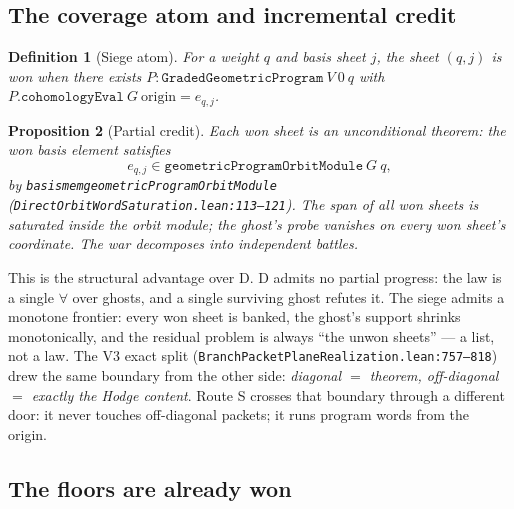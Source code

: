 \documentclass[11pt]{article}
\renewcommand{\_}{\textunderscore\allowbreak}
\newtheorem{definition}{Definition}[section]
\newtheorem{proposition}[definition]{Proposition}
\begin{document}
\subsection{The coverage atom and incremental credit}

\begin{definition}[Siege atom]\label{def:atom}
For a weight $q$ and basis sheet $j$, \emph{the sheet $(q,j)$ is won} when
there exists $P : \texttt{GradedGeometricProgram}\ V\ 0\ q$ with
$P.\texttt{cohomologyEval}\ G\ \text{origin} = e_{q,j}$.
\end{definition}

\begin{proposition}[Partial credit]\label{prop:partial}
Each won sheet is an unconditional theorem: the won basis element satisfies
\[
  e_{q,j} \in \texttt{geometricProgramOrbitModule}\ G\ q,
\]
by \texttt{basis\_mem\_geometricProgramOrbitModule}
(\texttt{DirectOrbitWordSaturation.lean:113--121}). The span of all won sheets
is saturated inside the orbit module; the ghost's probe vanishes on every won
sheet's coordinate. The war decomposes into independent battles.
\end{proposition}

This is the structural advantage over D. D admits no partial progress: the law
is a single $\forall$ over ghosts, and a single surviving ghost refutes it.
The siege admits a monotone frontier: every won sheet is banked, the ghost's
support shrinks monotonically, and the residual problem is always ``the
unwon sheets'' --- a list, not a law. The V3 exact split
(\texttt{BranchPacketPlaneRealization.lean:757--818}) drew the same boundary
from the other side: \emph{diagonal $=$ theorem, off-diagonal $=$ exactly the
Hodge content}. Route S crosses that boundary through a different door: it
never touches off-diagonal packets; it runs program words from the origin.

\subsection{The floors are already won}
\end{document}
